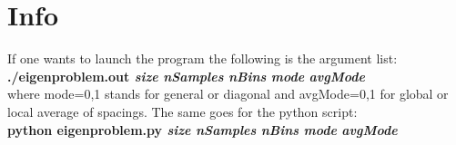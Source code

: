 \documentclass{article}
\begin{document}
\section*{Info}
If one wants to launch the program the following is the argument list: \\
\textbf{./eigenproblem.out \textit{size} \textit{nSamples} \textit{nBins} \textit{mode} \textit{avgMode}} \\
where mode=0,1 stands for general or diagonal and avgMode=0,1 for global or local average of spacings.
The same goes for the python script:\\
\textbf{python eigenproblem.py \textit{size} \textit{nSamples} \textit{nBins} \textit{mode} \textit{avgMode}} \\





\end{document}
